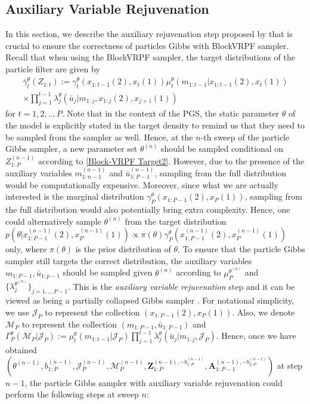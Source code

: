 \documentclass[12pt,a4paper]{article}
\begin{document}
\subsection{Auxiliary Variable Rejuvenation}\label{Section:Rejuvenation}
In this section, we describe the auxiliary rejuvenation step proposed by \cite{finke2014static} that is crucial to ensure the correctness of particles Gibbs with BlockVRPF sampler. Recall that when using the BlockVRPF sampler, the target distributions of the particle filter are given by 
\begin{multline}
    \label{Block-VRPF Target2}
    \bar{\gamma}_t^{\theta}\left(Z_{1:t}\right) := \gamma_t^{\theta}(x_{1:t-1}(2),x_t(1))\mu_t^{\theta}\left(m_{1:t-1}|x_{1:t-1}(2),x_t(1)\right)\\
    \times \prod_{j=1}^{t-1} \lambda_j^{\theta}\left(\bar{u}_{j} | m_{1:j},x_{1:j}(2),x_{j+1}(1)\right) 
\end{multline}
for \(t = 1,2,..,P\). Note that in the context of the PGS, the static parameter \(\theta\) of the model is explicitly stated in the target density to remind us that they need to be sampled from the sampler as well. Hence, at the \(n\)-th sweep of the particle Gibbs sampler, a new parameter set \(\theta^{(n)}\) should be sampled conditional on \(Z_{1:P}^{(n-1)}\) according to \eqref{Block-VRPF Target2}. However, due to the presence of the auxiliary variables \(m_{1:n-1}^{(n-1)}\) and \(\bar{u}_{1:P-1}^{(n-1)}\), sampling from the full distribution would be computationally expensive. Moreover, since what we are actually interested is the marginal distribution \(\gamma_P^{\theta}(x_{1:P-1}(2),x_P(1))\), sampling from the full distribution would also potentially bring extra complexity. Hence, one could alternatively sample \(\theta^{(n)}\) from the target distribution  \(p(\theta|x_{1:P-1}^{(n-1)}(2),x_P^{(n-1)}(1)) \propto \pi(\theta)\gamma_P^{\theta}(x_{1:P-1}^{(n-1)}(2),x_P^{(n-1)}(1))\) only, where \(\pi(\theta)\) is the prior distribution of \(\theta\). To ensure that the particle Gibbs sampler still targets the correct distribution, the auxiliary variables \(m_{1:P-1},\bar{u}_{1:p-1}\) should be sampled given \(\theta^{(n)}\) according to \(\mu_P^{\theta^{(n)}}\) and \(\{\lambda_j^{\theta^{(n)}}\}_{j=1,..,P-1}\). This is the \textit{auxiliary variable rejuvenation} step and it can be viewed as being a partially collapsed Gibbs sampler \citep{liu1994covariance,van2008partially}. For notational simplicity, we use \(\mathcal{J}_P\) to represent the collection \((x_{1:P-1}(2),x_P(1))\). Also, we denote \(\mathcal{M}_P\) to represent the collection \((m_{1:P-1},\bar{u}_{1:P-1})\) and \(\Gamma_P^{\theta}(\mathcal{M}_P|\mathcal{J}_P):= \mu_t^{\theta}\left(m_{1:t-1}|\mathcal{J}_P\right)\prod_{j=1}^{t-1} \lambda_j^{\theta}\left(\bar{u}_{j} | m_{1:j},\mathcal{J}_P\right)\). Hence, once we have obtained \((\theta^{(n-1)},b_{1:P}^{(n-1)},\mathcal{J}_P^{(n-1)},\mathcal{M}_P^{(n-1)},\mathbf{Z}_{1:P}^{(n-1),-b_{1:P}^{(n-1)}},\mathbf{A}_{1:P-1}^{(n-1),-b_{2:P}^{(n-1)}})\) at step \(n-1\), the particle Gibbs sampler with auxiliary variable rejuvenation could perform the following steps at sweep \(n\):
\end{document}
